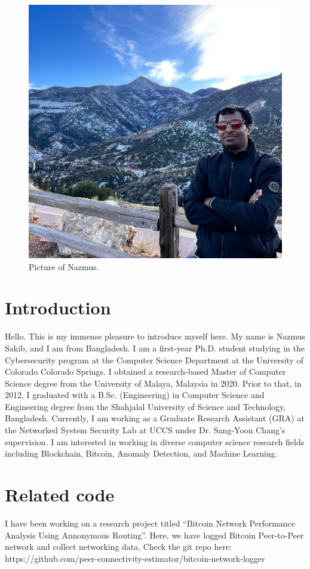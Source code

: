 

\begin{figure}[h!]
\centering
\includegraphics[width=.5\columnwidth]{picture-nazmus.jpg}
\caption{Picture of Nazmus.}
\label{fig:my-picture}
\end{figure}

\section{Introduction}

Hello. This is my immense pleasure to introduce myself here. My name is Nazmus Sakib, and I am from Bangladesh. I am a first-year Ph.D. student studying in the Cybersecurity program at the Computer Science Department at the University of Colorado Colorado Springs. I obtained a research-based Master of Computer Science degree from the University of Malaya, Malaysia in 2020. Prior to that, in 2012, I graduated with a B.Sc. (Engineering) in Computer Science and Engineering degree from the Shahjalal University of Science and Technology, Bangladesh. Currently, I am working as a Graduate Research Assistant (GRA) at the Networked System Security Lab at UCCS under Dr. Sang-Yoon Chang's supervision. I am interested in working in diverse computer science research fields including Blockchain, Bitcoin, Anomaly Detection, and Machine Learning.

\section{Related code}

I have been working on a research project titled ``Bitcoin Network Performance Analysis Using Annonymous Routing''. Here, we have logged Bitcoin Peer-to-Peer network and collect networking data.
Check the git repo here: https://github.com/peer-connectivity-estimator/bitcoin-network-logger

